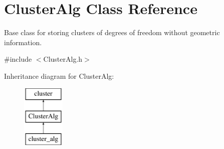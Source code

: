 \hypertarget{classClusterAlg}{
\section{\-Cluster\-Alg \-Class \-Reference}
\label{classClusterAlg}
}


\-Base class for storing clusters of degrees of freedom without geometric information.  




{\ttfamily \#include $<$\-Cluster\-Alg.\-h$>$}

\-Inheritance diagram for \-Cluster\-Alg\-:\begin{figure}[H]
\begin{center}
\leavevmode
\includegraphics[height=3.000000cm]{classClusterAlg}
\end{center}
\end{figure}
